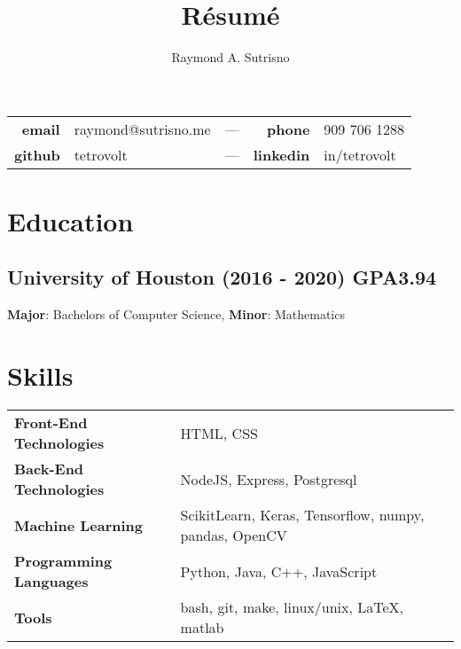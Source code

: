\documentclass{article}
\title{R\'esum\'e}
\author{Raymond A. Sutrisno}
\date{}
\makeatletter
\renewcommand{\maketitle}{
\begin{center}
{\Large\bfseries\theauthor}
\vspace{.25em}

\begin{center}
\begin{tabular}{ r l c r l }
 \textbf{email} & raymond@sutrisno.me & --- & \textbf{phone} & 909 706 1288 \\
 \textbf{github} & tetrovolt & --- & \textbf{linkedin} & in/tetrovolt
\end{tabular}
\end{center}

\end{center}
}
\makeatother
\begin{document}
\maketitle

\section{Education}
\subsection{University of Houston (2016 - 2020) \textbf{GPA}{3.94}}
\textbf{Major}: Bachelors of Computer Science, \textbf{Minor}: Mathematics

\section{Skills}
\begin{tabular}{p{5cm} l}
    \textbf{Front-End Technologies} & HTML, CSS \\
    \textbf{Back-End Technologies} & NodeJS, Express, Postgresql \\
    \textbf{Machine Learning} & ScikitLearn, Keras, Tensorflow, numpy, pandas, OpenCV \\
    \textbf{Programming Languages} & Python, Java, C++, JavaScript  \\
    \textbf{Tools} & bash, git, make, linux/unix, \LaTeX, matlab
\end{tabular}
\end{document}
